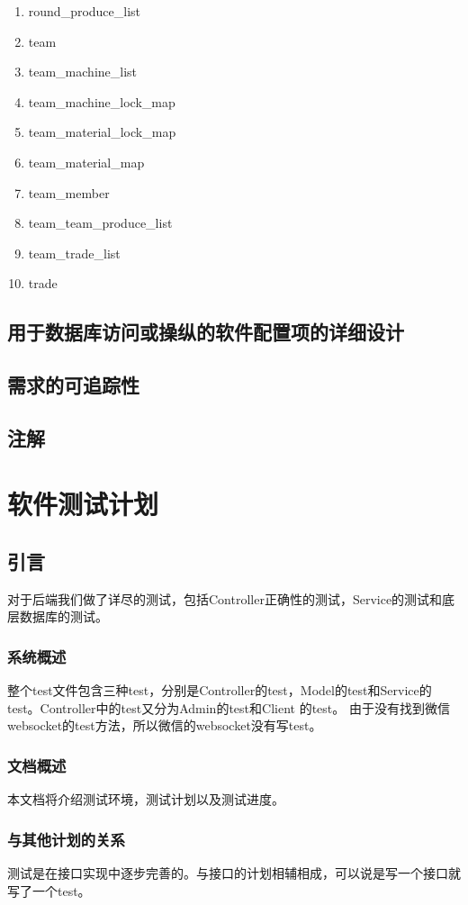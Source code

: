 \documentclass{article}
\begin{document}
{\begin{enumerate}
  \item round\_produce\_list
  \item team
  \item team\_machine\_list
  \item team\_machine\_lock\_map
  \item team\_material\_lock\_map
  \item team\_material\_map
  \item team\_member
  \item team\_team\_produce\_list
  \item team\_trade\_list
  \item trade
\end{enumerate}
} %

\subsection{用于数据库访问或操纵的软件配置项的详细设计}

\subsection{需求的可追踪性}

\subsection{注解}

\section{软件测试计划}
\label{软件测试计划}
\subsection{引言}
对于后端我们做了详尽的测试，包括Controller正确性的测试，Service的测试和底层数据库的测试。
\subsubsection{系统概述}
整个test文件包含三种test，分别是Controller的test，Model的test和Service的test。Controller中的test又分为Admin的test和Client 的test。 由于没有找到微信websocket的test方法，所以微信的websocket没有写test。
\subsubsection{文档概述}
本文档将介绍测试环境，测试计划以及测试进度。
\subsubsection{与其他计划的关系}
测试是在接口实现中逐步完善的。与接口的计划相辅相成，可以说是写一个接口就写了一个test。
\end{document}
